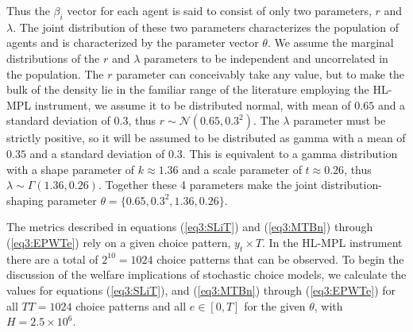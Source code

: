 \documentclass[../main.tex]{subfiles}
\begin{document}
\noindent Thus the $\beta_i$ vector for each agent is said to consist of only two parameters, $r$ and $\lambda$.
The joint distribution of these two parameters characterizes the population of agents and is characterized by the parameter vector $\theta$.
We assume the marginal distributions of the $r$ and $\lambda$ parameters to be independent and uncorrelated in the population.{\footnotemark}
The $r$ parameter can conceivably take any value, but to make the bulk of the density lie in the familiar range of the literature employing the HL-MPL instrument, we assume it to be distributed normal, with mean of $0.65$ and a standard deviation of $0.3$, thus $r \sim \mathcal{N}(0.65 , 0.3^2 )$.
The $\lambda$ parameter must be strictly positive, so it will be assumed to be distributed as gamma with a mean of $0.35$ and a standard deviation of $0.3$.
This is equivalent to a gamma distribution with a shape parameter of $k \approx 1.36$ and a scale parameter of $t\approx0.26$, thus $\lambda \sim \Gamma(1.36 , 0.26)$.
Together these 4 parameters make the joint distribution-shaping parameter $\theta=\{0.65 ,0.3^2, 1.36 , 0.26\}$.

The metrics described in equations (\ref{eq3:SLiT}) and (\ref{eq3:MTBn}) through (\ref{eq3:EPWTe}) rely on a given choice pattern, $y_t \times T$.
In the HL-MPL instrument there are a total of $2^{10}=1024$ choice patterns that can be observed.
To begin the discussion of the welfare implications of stochastic choice models, we calculate the values for equations (\ref{eq3:SLiT}), and (\ref{eq3:MTBn}) through (\ref{eq3:EPWTe}) for all $\mathit{TT} =1024$ choice patterns and all $e \in[0,T]$ for the given $\theta$, with $H=2.5 \times 10^6$.





\addtocounter{footnote}{-1}
\end{document}

